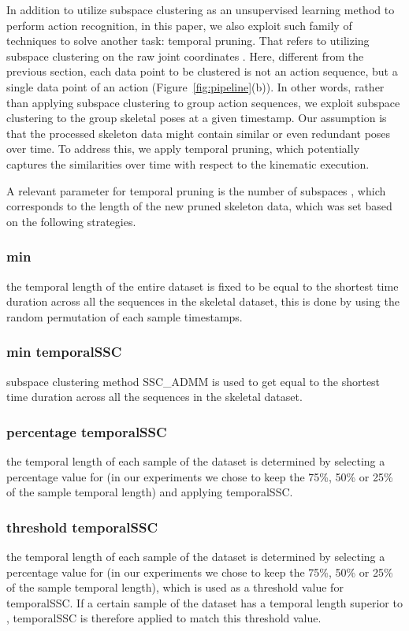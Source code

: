 \documentclass[10pt,a4paper,conference]{IEEEtran}
\begin{document}
In addition to utilize subspace clustering as an unsupervised learning method to perform action recognition, in this paper, we also exploit such family of techniques to solve another task: temporal pruning.
That refers to utilizing subspace clustering on the raw joint coordinates .
Here, different from the previous section, each data point to be clustered is not an action sequence, but a single data point of an action (Figure~\ref{fig:pipeline}(b)). 
In other words, rather than applying subspace clustering to group action sequences, we exploit subspace clustering to the group skeletal poses at a given timestamp.
Our assumption is that the processed skeleton data might contain similar or even redundant poses over time. To address this, we apply temporal pruning, which potentially captures the similarities over time with respect to the kinematic execution. 

A relevant parameter for temporal pruning is the number of subspaces , which corresponds to the length of the new pruned skeleton data, which was set based on the following strategies.\subsubsection{min } the temporal length of the entire dataset is fixed to be equal to the shortest time duration across all the sequences in the skeletal dataset, this is done by using the random permutation of each sample timestamps.
\subsubsection{min temporalSSC} subspace clustering method SSC\_ADMM is used to get  equal to the shortest time duration across all the sequences in the skeletal dataset.
\subsubsection{percentage temporalSSC} the temporal length of each sample of the dataset is determined by selecting a percentage value for  (in our experiments we chose to keep the 75\%, 50\% or 25\% of the sample temporal length) and applying temporalSSC.
\subsubsection{threshold temporalSSC} the temporal length of each sample of the dataset is determined by selecting a percentage value for  (in our experiments we chose to keep the 75\%, 50\% or 25\% of the sample temporal length), which is used as a threshold value for temporalSSC. If a certain sample of the dataset has a temporal length superior to , temporalSSC is therefore applied to match this threshold value. 
\end{document}
